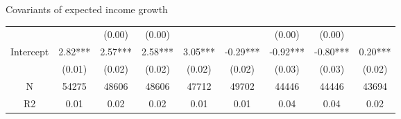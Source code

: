 \documentclass{beamer}
\begin{document}
\begin{frame}{Covariants of expected income growth}
\begin{table}
{\begin{tabular}{ccccccccc}
				&           &    (0.00) &     (0.00) &             &           &     (0.00) &      (0.00) &              \\
				Intercept        &   2.82*** &   2.57*** &    2.58*** &     3.05*** &  -0.29*** &   -0.92*** &    -0.80*** &      0.20*** \\
				&    (0.01) &    (0.02) &     (0.02) &      (0.02) &    (0.02) &     (0.03) &      (0.03) &       (0.02) \\
				\hline 
				N                &     54275 &     48606 &      48606 &       47712 &     49702 &      44446 &       44446 &        43694 \\
				R2               &      0.01 &      0.02 &       0.02 &        0.01 &      0.01 &       0.04 &        0.04 &         0.02 \\
				
				\hline 
			\end{tabular}
		}
	\end{table}
\end{frame}
\end{document}
